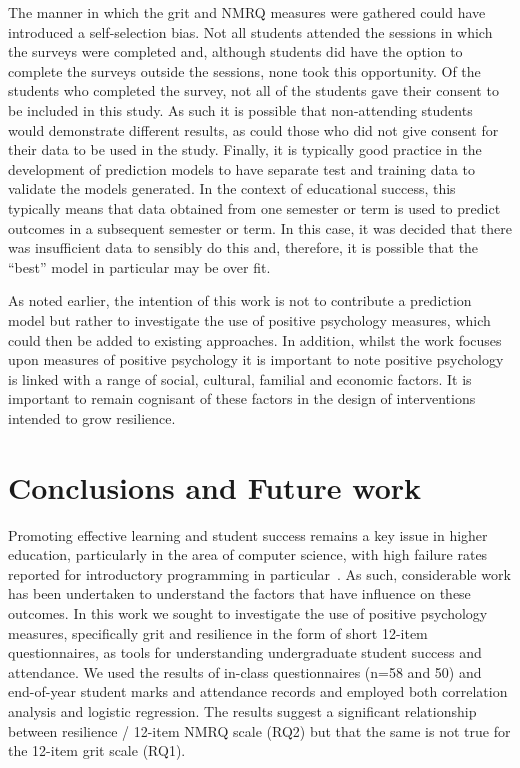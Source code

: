 \documentclass[sigconf]{acmart}
\begin{document}
The manner in which the grit and NMRQ measures were gathered could have introduced a self-selection bias. Not all students attended the sessions in which the surveys were completed and, although students did have the option to complete the surveys outside the sessions, none took this opportunity. Of the students who completed the survey, not all of the students gave their consent to be included in this study. As such it is possible that non-attending students would demonstrate different results, as could those who did not give consent for their data to be used in the study. Finally, it is typically good practice in the development of prediction models to have separate test and training data to validate the models generated. In the context of educational success, this typically means that data obtained from one semester or term is used to predict outcomes in a subsequent semester or term. In this case, it was decided that there was insufficient data to sensibly do this and, therefore, it is possible that the ``best'' model in particular may be over fit. 

As noted earlier, the intention of this work is not to contribute a prediction model but rather to investigate the use of positive psychology measures, which could then be added to existing approaches. In addition, whilst the work focuses upon measures of positive psychology it is important to note positive psychology is linked with a range of social, cultural, familial and economic factors. It is important to remain cognisant of these factors in the design of interventions intended to grow resilience.

\section{Conclusions and Future work}
Promoting effective learning and student success remains a key issue in higher education, particularly in the area of computer science, with high failure rates reported for introductory programming in particular~\cite{Watson:2014:FRI:2591708.2591749,Bennedsen2019}. As such, considerable work has been undertaken to understand the factors that have influence on these outcomes. In this work we sought to investigate the use of positive psychology measures, specifically grit and resilience in the form of short 12-item questionnaires, as tools for understanding undergraduate student success and attendance. We used the results of in-class questionnaires (n=58 and 50) and end-of-year student marks and attendance records and employed both correlation analysis and logistic regression. The results suggest a significant relationship between resilience / 12-item NMRQ scale (RQ2) but that the same is not true for the 12-item grit scale (RQ1).
\end{document}
